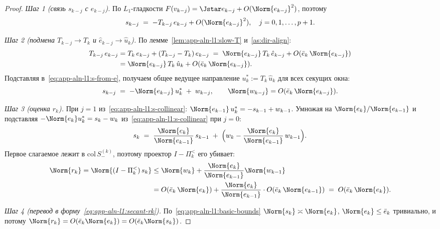 \begin{proof}
\emph{Шаг 1 \textup{(}связь $s_{k-j}$ с $e_{k-j}$\textup{)}.}
По $L_1$-гладкости $F(v_{k-j}) = \Jstar e_{k-j} + O(\Norm{e_{k-j}}^{2})$,
поэтому
\begin{equation}
s_{k-j} \;=\; -T_{k-j}\,e_{k-j} + O(\Norm{e_{k-j}}^{2}),
\quad j = 0,1,\ldots,p+1.
\label{eq:app-aln-l1:s-from-e}
\end{equation}

\emph{Шаг 2 \textup{(}подмена $T_{k-j}\to T_k$ и $\hat e_{k-j}\to\hat u_k$\textup{)}.}
По лемме~\ref{lem:app-aln-l1:slow-T} и~\ref{as:dir-align}:
\begin{align*}
T_{k-j}\,e_{k-j}
&= T_k\,e_{k-j} + (T_{k-j}-T_k)\,e_{k-j}
\;=\; \Norm{e_{k-j}}\,T_k\,\hat e_{k-j}
+ O(\bar e_k\,\Norm{e_{k-j}}) \\
&= \Norm{e_{k-j}}\,T_k\,\hat u_k
+ O(\bar e_k\,\Norm{e_{k-j}}).
\end{align*}
Подставляя в~\eqref{eq:app-aln-l1:s-from-e}, получаем общее ведущее
направление $u^{*}_{k} := T_k\,\hat u_k$ для всех секущих окна:
\begin{equation}
s_{k-j} \;=\; -\Norm{e_{k-j}}\,u^{*}_{k} \;+\; w_{k-j},
\qquad
\Norm{w_{k-j}} = O(\bar e_k\,\Norm{e_{k-j}}).
\label{eq:app-aln-l1:s-collinear}
\end{equation}

\emph{Шаг 3 \textup{(}оценка $r_k$\textup{)}.}
При $j=1$ из~\eqref{eq:app-aln-l1:s-collinear}:
$\Norm{e_{k-1}}\,u^{*}_{k} = -s_{k-1} + w_{k-1}$. Умножая на
$\Norm{e_k}/\Norm{e_{k-1}}$ и подставляя $-\Norm{e_k}u^{*}_{k}
= s_k - w_k$ из~\eqref{eq:app-aln-l1:s-collinear} при $j=0$:
\begin{equation*}
s_k \;=\; \frac{\Norm{e_k}}{\Norm{e_{k-1}}}\,s_{k-1}
\;+\; \Bigl(w_k - \frac{\Norm{e_k}}{\Norm{e_{k-1}}}\,w_{k-1}\Bigr).
\end{equation*}
Первое слагаемое лежит в $\mathrm{col}\,S_-^{(k)}$, поэтому проектор
$I-\Pi_k^{<}$ его убивает:
\begin{align*}
\Norm{r_k} = \Norm{(I-\Pi_k^{<})\,s_k}
&\le \Norm{w_k} + \frac{\Norm{e_k}}{\Norm{e_{k-1}}}\Norm{w_{k-1}} \\
&= O(\bar e_k\,\Norm{e_k})
+ \frac{\Norm{e_k}}{\Norm{e_{k-1}}}\cdot O(\bar e_k\,\Norm{e_{k-1}})
\;=\; O(\bar e_k\,\Norm{e_k}).
\end{align*}

\emph{Шаг 4 \textup{(}перевод в форму~\eqref{eq:app-aln-l1:secant-rk}\textup{)}.}
По~\eqref{eq:app-aln-l1:basic-bounds} $\Norm{s_k}\asymp\Norm{e_k}$,
$\Norm{e_k}\le\bar e_k$ тривиально, и потому
$\Norm{r_k} = O(\bar e_k\Norm{e_k}) = O(\bar e_k\Norm{s_k})$.
\end{proof}

